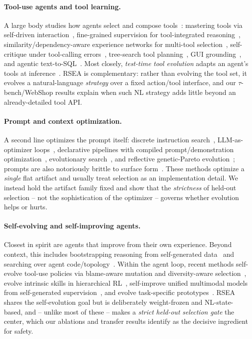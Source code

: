 \documentclass{article}
\begin{document}
\paragraph{Tool-use agents and tool learning.} A large body studies how agents select
and compose tools~\citep{qu2025tool}: mastering tools via self-driven
interaction~\citep{quexploration}, fine-grained supervision for tool-integrated
reasoning~\citep{qu2026matchtir}, similarity/dependency-aware experience networks for
multi-tool selection~\citep{zhang-etal-2025-toolexpnet}, self-critique under
tool-calling errors~\citep{huang2025critictool}, tree-search tool
planning~\citep{yang2026tooltree}, GUI grounding~\citep{lian2025ui}, and agentic
text-to-SQL~\citep{li2026sqlastra, su2026agenticsql}. Most closely, \emph{test-time
tool evolution} adapts an agent's tools at inference~\citep{lu2026beyond}. RSEA is
complementary: rather than evolving the tool set, it evolves a natural-language
\emph{strategy} over a fixed action/tool interface, and our $\tau$-bench/WebShop
results explain when such NL strategy adds little beyond an already-detailed tool API.

\paragraph{Prompt and context optimization.} A second line optimizes the prompt
itself: discrete instruction search~\citep{zhou2023ape}, LLM-as-optimizer
loops~\citep{yang2024opro}, declarative pipelines with compiled prompt/demonstration
optimization~\citep{khattab2024dspy, opsahlong2024mipro}, evolutionary
search~\citep{fernando2023promptbreeder}, and reflective genetic-Pareto
evolution~\citep{agrawal2025gepa}; prompts are also notoriously brittle to surface
form~\citep{cai2025does}. These methods optimize a \emph{single} flat artifact and
usually treat selection as an implementation detail. We instead hold the artifact
family fixed and show that the \emph{strictness} of held-out selection -- not the
sophistication of the optimizer -- governs whether evolution helps or hurts.

\paragraph{Self-evolving and self-improving agents.} Closest in spirit are agents
that improve from their own experience. Beyond context, this includes bootstrapping
reasoning from self-generated data~\citep{zelikman2022star} and searching over agent
code/topology~\citep{hu2024adas}. Within the agent loop, recent methods self-evolve
tool-use policies via blame-aware mutation and diversity-aware
selection~\citep{yang2026evotool}, evolve intrinsic skills in hierarchical
RL~\citep{li2026arise}, self-improve unified multimodal models from self-generated
supervision~\citep{han2026unicorn}, and evolve task-specific
prototypes~\citep{zhu2025pathology}. RSEA shares the self-evolution goal but is
deliberately weight-frozen and NL-state-based, and -- unlike most of these -- makes a
\emph{strict held-out selection gate} the center, which our ablations and transfer
results identify as the decisive ingredient for safety.
\end{document}
